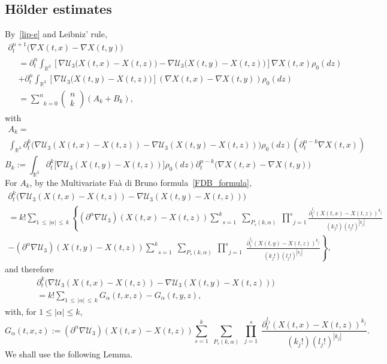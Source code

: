 \documentclass[AHL,Unicode,longabstracts,published]{cedram}
\newcommand{\R}{\mathbb{R}}
\newcommand{\clU}{\mathcal{U}}
\renewcommand{\leq}{\leqslant}
\begin{document}
\subsection{H\"older estimates}
By~\eqref{lip-e} and Leibniz' rule,
\begin{multline*}
\partial_t^{n+1}\big(\nabla X(t,x)-\nabla X(t,y)\big)
\\
\begin{aligned}
&= \partial_t^n \int_{\R^3} \left[\nabla \clU_3\big(X(t,x)-X(t,z)\big)-\nabla \clU_3\big(X(t,y)-X(t,z)\big) \right]\nabla X(t,x) \rho_0(dz)\\
&+ \partial_t^n \int_{\R^3} \left[\nabla \clU_3\big(X(t,y)-X(t,z)\big) \right] \left(\nabla X(t,x)-\nabla X(t,y) \right) \rho_0(dz)\\
&=\underset{k=0}{\overset{n}{\sum}}
\begin{pmatrix}
n\\ k
\end{pmatrix} (A_k+ B_k),
\end{aligned}
\end{multline*}
with
\begin{multline*}
A_k =\\ \int_{\R^3} \partial_t^k \big(\nabla \clU_3(X(t,x)-X(t,z))-\nabla \clU_3(X(t,y)-X(t,z)) \big)\rho_0(dz) \left(\partial_t^{n-k}\nabla X(t,x)\right)
\end{multline*}
\[
B_k :=\int_{\R^3} \partial_t^k \big[\nabla \clU_3(X(t,y)-X(t,z)) \big] \rho_0(dz) \partial_t^{n-k}\big(\nabla X(t,x)-\nabla X(t,y) \big)
\]
For $A_k$, by the Multivariate Faà di Bruno formula~\eqref{FDB_formula},
\begin{multline*}
\partial_t^k \big(\nabla \clU_3(X(t,x)-X(t,z))-\nabla \clU_3(X(t,y)-X(t,z)) \big)\\
=k! \underset{1\,\leq\,|\alpha|\,\leq\,k}{\sum} \left\{ \left(\partial^\alpha \nabla \clU_3 \right)(X(t,x)-X(t,z)) \underset{s=1}{\overset{k}{\sum}}\;\underset{P_s(k,\alpha)}{\sum}\;\underset{j=1}{\overset{s}{\prod}}\frac{\partial_t^{l_j} (X(t,x)-X(t,z))^{k_j}}{\left(k_j!\right) \left(l_j!\right)^{\left|k_j\right|}}\right.\\
\left. - \left(\partial^\alpha \nabla \clU_3 \right)(X(t,y)-X(t,z)) \underset{s=1}{\overset{k}{\sum}}\;\underset{P_s(k,\alpha)}{\sum}\;\underset{j=1}{\overset{s}{\prod}}\;\frac{\partial_t^{l_j} (X(t,y)-X(t,z))^{k_j}}{\left(k_j!\right) \left(l_j!\right)^{\left|k_j\right|}} \right\},
\end{multline*}
and therefore
\begin{multline}\label{tard}
\partial_t^k \big(\nabla \clU_3(X(t,x)-X(t,z))-\nabla \clU_3(X(t,y)-X(t,z)) \big)  \\
= k! \underset{1\,\leq\,|\alpha|\,\leq\,k}{\sum} G_\alpha(t,x,z)-G_\alpha(t,y,z),
\end{multline}
with, for $1\leq |\alpha|\leq k$,
\[
G_\alpha(t,x,z):=\left(\partial^\alpha \nabla \clU_3 \right)(X(t,x)-X(t,z)) \underset{s=1}{\overset{k}{\sum}}\;\underset{P_s(k,\alpha)}{\sum}\;\underset{j=1}{\overset{s}{\prod}}\;\frac{\partial_t^{l_j} (X(t,x)-X(t,z))^{k_j}}{\left(k_j!\right) \left(l_j!\right)^{\left|k_j\right|}}.
\]
We shall use the following Lemma.
\end{document}
